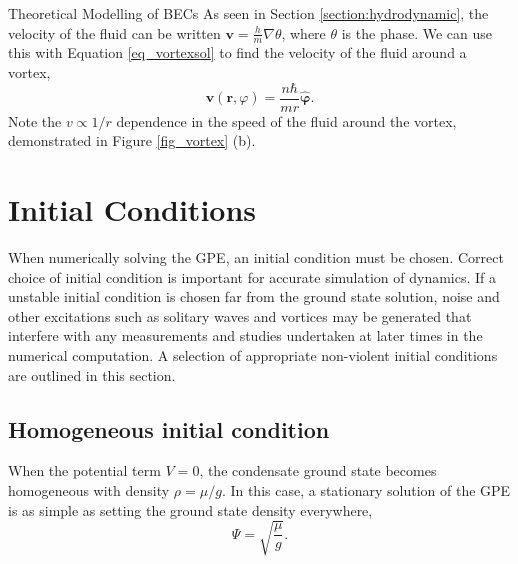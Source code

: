 \begin{chapter}{\label{cha:theoretical_model}Theoretical Modelling of BECs}
As seen in Section \ref{section:hydrodynamic}, the velocity of the fluid can be written $\mathbf{v} = \frac{h}{m}\nabla\theta$, where $\theta$ is the phase. We can use this with Equation \ref{eq_vortexsol} to find the velocity of the fluid around a vortex,
	\begin{equation}\label{eq_vortexvel}
	\mathbf{v}(\mathbf{r},\varphi) = \frac{n \hbar}{mr} {\bm{\hat{\varphi}}}.
	\end{equation}
Note the $v \propto 1/r$ dependence in the speed of the fluid around the vortex, demonstrated in Figure \ref{fig_vortex} (b). 

\section{\label{section:inital} Initial Conditions}
	When numerically solving the GPE, an initial condition must be chosen. Correct choice of initial condition is important for accurate simulation of dynamics. If a unstable initial condition is chosen far from the ground state solution, noise and other excitations such as solitary waves and vortices may be generated that interfere with any measurements and studies undertaken at later times in the numerical computation. A selection of appropriate non-violent initial conditions are outlined in this section. 
	\subsection{\label{section:homoinit} Homogeneous initial condition}
	When the potential term $V=0$, the condensate ground state becomes homogeneous with density $\rho=\mu/g$. In this case, a stationary solution of the GPE is as simple as setting the ground state density everywhere,
	\begin{equation}
		\Psi = \sqrt{\frac{\mu}{g}}.
		\label{eq:homoinit}
	\end{equation}


\end{chapter}
